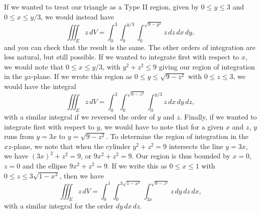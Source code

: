 \documentclass[letterpaper,12pt]{article}
\begin{document}
If we wanted to treat our triangle as a Type II region, given by $0\leq y\leq 3$ and $0\leq x\leq y/3$, we would instead have
\[
\iiint_E z\,dV = \int_0^3\int_0^{y/3}\int_0^{\sqrt{9-y^2}}z\,dz\,dx\,dy,
\]
and you can check that the result is the same. The other orders of integration are less natural, but still possible. If we wanted to integrate first with respect to $x$, we would note that $0\leq x\leq y/3$, with $y^2+z^2\leq 9$ giving our region of integration in the $yz$-plane. If we wrote this region as $0\leq y\leq \sqrt{9-z^2}$ with $0\leq z\leq 3$, we would have the integral
\[
\iiint_E z\,dV = \int_0^3\int_0^{\sqrt{9-z^2}}\int_0^{y/3}z\,dx\,dy\,dz,
\]
with a similar integral if we reversed the order of $y$ and $z$. Finally, if we wanted to integrate first with respect to $y$, we would have to note that for a given $x$ and $z$, $y$ runs from $y=3x$ to $y=\sqrt{9-z^2}$. To determine the region of integration in the $xz$-plane, we note that when the cylinder $y^2+z^2=9$ intersects the line $y=3x$, we have $(3x)^2+z^2=9$, or $9x^2+z^2=9$. Our region is thus bounded by $x=0$, $z=0$ and the ellipse $9x^2+z^2=9$. If we write this as $0\leq x\leq 1$ with $0\leq z\leq 3\sqrt{1-x^2}$, then we have
\[
\iiint_Ez\,dV = \int_0^1\int_0^{3\sqrt{1-x^2}}\int_{3x}^{\sqrt{9-z^2}}z\,dy\,dz\,dx,
\]
with a similar integral for the order $dy\,dx\,dz$.
\end{document}
